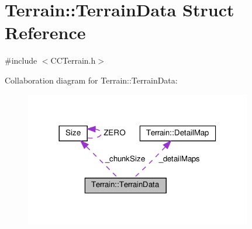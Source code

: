 \hypertarget{structTerrain_1_1TerrainData}{}\section{Terrain\+:\+:Terrain\+Data Struct Reference}
\label{structTerrain_1_1TerrainData}


{\ttfamily \#include $<$C\+C\+Terrain.\+h$>$}



Collaboration diagram for Terrain\+:\+:Terrain\+Data\+:
\nopagebreak
\begin{figure}[H]
\begin{center}
\leavevmode
\includegraphics[width=281pt]{structTerrain_1_1TerrainData__coll__graph}
\end{center}
\end{figure}
